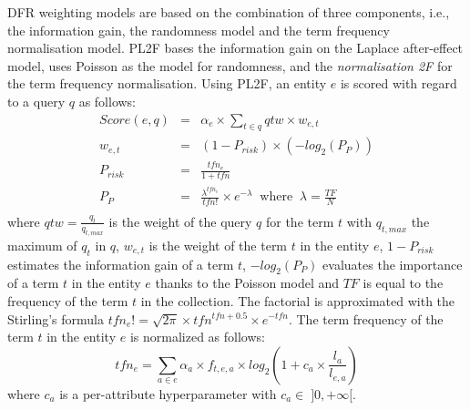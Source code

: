 DFR weighting models are based on the combination of three components, i.e., the information gain, the randomness model and the term frequency normalisation model. PL2F bases the information gain on the Laplace after-effect model, uses Poisson as the model for randomness, and the \emph{normalisation 2F} for the term frequency normalisation.
Using PL2F, an entity $e$ is scored with regard to a query $q$ as follows:
\begin{eqnarray*}
  Score(e,q) & = & \alpha_e\times\sum_{t\in q}{qtw \times w_{e,t}}\\
  \label{eq:dfr-score}
  w_{e,t} & = & \left(1-P_{risk}\right) \times \left(-log_2\left(P_{P}\right)\right) \\
  \label{eq:dfr-term-weight}
  P_{risk} & = & \frac{tfn_e}{1+tfn} \\
  \label{eq:dfr-prisk}
  P_{P} & = & \frac{\lambda^{tfn_e}}{tfn!}\times e^{-\lambda} \:\text{ where }\: \lambda=\frac{TF}{N} \\
  \label{eq:dfr:rand-poisson}
\end{eqnarray*}
where $qtw=\frac{q_t}{q_{t,max}}$ is the weight of the query $q$ for the term $t$ with $q_{t,max}$ the maximum of $q_t$ in $q$, $w_{e,t}$ is the weight of the term $t$ in the entity $e$, $1-P_{risk}$ estimates the information gain of a term $t$, $-log_2\left(P_{P}\right)$ evaluates the importance of a term $t$ in the entity $e$ thanks to the Poisson model and $TF$ is equal to the frequency of the term $t$ in the collection. The factorial is approximated with the Stirling's formula \mbox{$tfn_e!=\sqrt{2\pi}\times tfn^{tfn+0.5}\times e^{-tfn}$}.
The term frequency of the term $t$ in the entity $e$ is normalized as follows:
\begin{equation}
  tfn_e = \sum_{a\in e}{\alpha_a\times f_{t,e,a} \times log_2\left(1+c_a\times\frac{l_a}{l_{e,a}}\right)}
  \label{eq:pl2f}
\end{equation}
where $c_a$ is a per-attribute hyperparameter with $c_a \in\;]0,+\infty[$.
